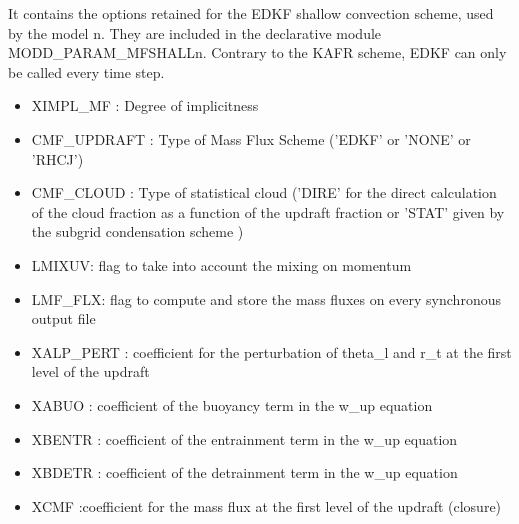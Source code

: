 It contains the options retained for the EDKF shallow convection scheme, used
by the  model n. They are included in the declarative module
MODD\_PARAM\_MFSHALLn. Contrary to the KAFR scheme,
EDKF can only be called  every time step. 

\begin{itemize}
\item
{}
XIMPL\_MF : Degree of implicitness                                                        
\item
{}
CMF\_UPDRAFT : Type of Mass Flux Scheme                              
('EDKF' or 'NONE' or 'RHCJ')
\item
{}
CMF\_CLOUD : Type of statistical cloud                                 
('DIRE' for the direct calculation of the cloud fraction as a function of the updraft fraction 
or 'STAT' given by the subgrid condensation scheme )
\item
{}
LMIXUV: flag to take into account the mixing on momentum      
\item
{}
LMF\_FLX: flag to compute and store the mass fluxes on every synchronous output  file
\item
{}
XALP\_PERT : coefficient for the perturbation of theta\_l and r\_t at the first level of the updraft
\item
{}
XABUO : coefficient of the buoyancy term in the w\_up equation
\item
{}
XBENTR : coefficient of the entrainment term in the w\_up equation
\item
{}
XBDETR : coefficient of the detrainment term in the w\_up equation
\item
{}
XCMF :coefficient for the mass flux at the first level of the updraft (closure)


\end{itemize}
